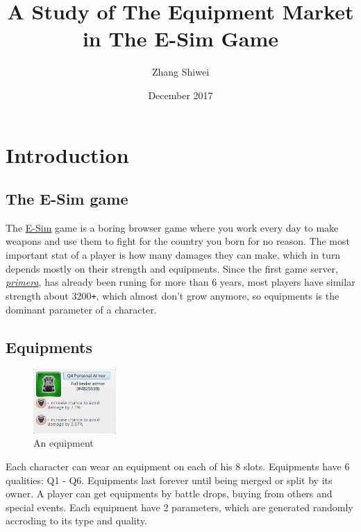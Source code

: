 \documentclass{manuscript}
\title{A Study of The Equipment Market in The E-Sim Game}
\author{Zhang Shiwei}
\date{December 2017}
\begin{document}
    \maketitle

    \section{Introduction}

    \subsection{The E-Sim game}

    The \href{https://www.e-sim.org}{E-Sim} game is a boring browser game where you work every day to make weapons and
    use them to fight for the country you born for no reason. The most important stat of a player is how many damages
    they can make, which in turn depends mostly on their strength and equipments. Since the first game server,
    \href{https://primera.e-sim.org}{\textit{primera}}, has already been runing for more than 6 years, most players have
    similar strength about 3200\verb!+!, which almost don't grow anymore, so equipments is the dominant parameter of a
    character.

    \subsection{Equipments}

    \begin{figure}
        \centering
        \vspace{-1\baselineskip}
        \includegraphics[width=0.28\textwidth]{equipment_example.png}
        \caption{An equipment}\label{fig:an_equipment}
    \end{figure}

    Each character can wear an equipment on each of his 8 slots. Equipments have 6 qualities: Q1 - Q6. Equipments last
    forever until being merged or split by its owner. A player can get equipments by battle drops, buying from others
    and special events. Each equipment have 2 parameters, which are generated randomly accroding to its type and quality.
\end{document}
